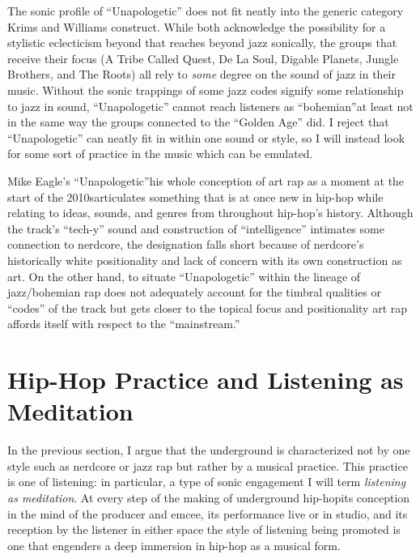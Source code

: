 The sonic profile of ``Unapologetic'' does not fit neatly into the generic category Krims and Williams
construct. While both acknowledge the possibility for a stylistic eclecticism beyond that reaches beyond
jazz sonically, the groups that receive their focus (A Tribe Called Quest, De La Soul, Digable Planets, 
Jungle Brothers, and The Roots) all rely to \emph{some} degree on the sound of jazz in their music. 
Without the sonic trappings of some jazz codes signify some relationship to jazz in sound, 
``Unapologetic'' cannot reach listeners as ``bohemian''\textemdash at least not in the same way 
the groups connected to the ``Golden Age'' did. I reject that ``Unapologetic'' can neatly
fit in within one sound or style, so I will instead look for some sort of practice in the music
which can be emulated.

Mike Eagle's ``Unapologetic''\textemdash his whole conception of art rap as a moment at the start
of the 2010s\textemdash articulates something that is at once new in hip-hop while relating to ideas,
sounds, and genres from throughout hip-hop's history. Although the track's ``tech-y'' sound and 
construction of ``intelligence'' intimates some connection to nerdcore, the designation falls short 
because of nerdcore's historically white positionality and lack of concern with its own construction 
as art. On the other hand, to situate ``Unapologetic'' within the lineage of jazz/bohemian rap does 
not adequately account for the  timbral qualities or ``codes'' of the track but gets closer to the 
topical focus and  positionality art rap affords itself with respect to the ``mainstream.''

\section{Hip-Hop Practice and Listening as Meditation} \label{listeningasmeditation}

In the previous section, I argue that the underground is characterized not by one style such as
nerdcore or jazz rap but rather by a musical practice. This practice is one of listening: in 
particular, a type of sonic engagement I will term \emph{listening as meditation}. At every step 
of the making of underground hip-hop\textemdash its conception in the mind of the producer and 
emcee, its performance live or in studio, and its reception by the listener in either space\textemdash 
the style of listening being promoted is one that engenders a deep immersion in hip-hop as a 
musical form.

